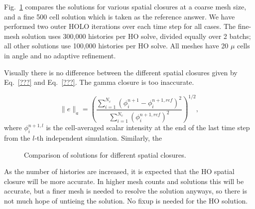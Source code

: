 Fig.~\ref{fig:smooth_compare} compares the solutions for various spatial closures at a
coarse mesh size, and a fine 500 cell solution which is taken as the reference answer. We
have performed two outer HOLO iterations over each time step for all cases.   The
fine-mesh solution uses 300,000 histories per HO solve, divided equally over 2 batchs; all
other solutions use 100,000 histories per HO solve.  All meshes have 20 $\mu$
cells in angle and no adaptive refinement.

Visually there
is no difference between the different spatial closures given by Eq.~\eqref{???} and Eq.~\eqref{???}. The
gamma closure is too inaccurate.

\begin{equation}
    \|e\|_a = \left({\frac{\sum\limits_{i=1}^{N_c}
    \left(\phi_i^{n+1} - \phi_i^{n+1,ref}
\right)^2}{\sum\limits_{i=1}^{N_c}\left(\phi_i^{n+1,ref}\right)^2}}\right)^{1/2},
\end{equation}
where $\phi_i^{n+1,l}$ is the cell-averaged scalar intensity at the end of the last time
step from the $l$-th independent simulation.  Similarly, the 





\begin{figure}[H]
    \centering
    \caption{\label{fig:smooth_compare} Comparison of solutions for different spatial closures.}
\end{figure}

\begin{table}[H]

\end{table}

As the number of histories are increased, it is expected that the HO spatial closure will
be more accurate. In higher mesh counts and solutions this will be accurate, but a finer
mesh is needed to resolve the solution anyways, so there is not much hope of untieing the
solution.  No fixup is needed for the HO solution.




